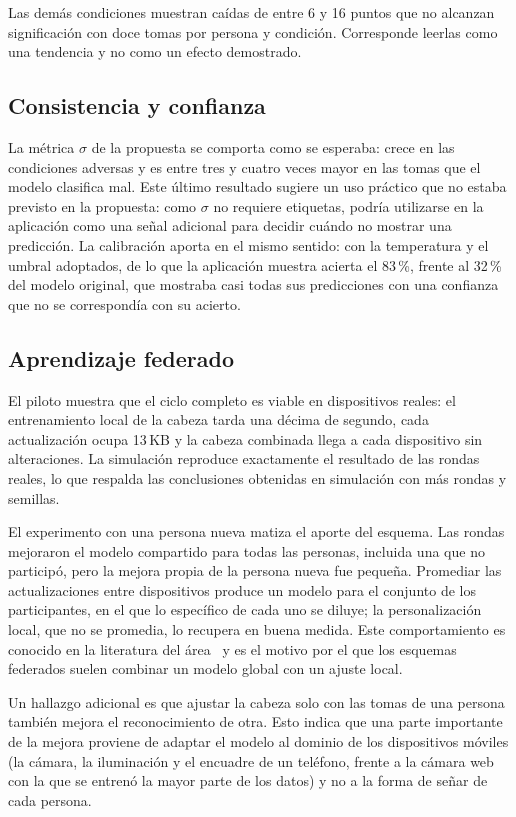 Las demás condiciones muestran caídas de entre 6 y 16 puntos que no alcanzan significación con doce tomas por persona y condición. Corresponde leerlas como una tendencia y no como un efecto demostrado.

\subsection{Consistencia y confianza}

La métrica $\sigma$ de la propuesta se comporta como se esperaba: crece en las condiciones adversas y es entre tres y cuatro veces mayor en las tomas que el modelo clasifica mal. Este último resultado sugiere un uso práctico que no estaba previsto en la propuesta: como $\sigma$ no requiere etiquetas, podría utilizarse en la aplicación como una señal adicional para decidir cuándo no mostrar una predicción. La calibración aporta en el mismo sentido: con la temperatura y el umbral adoptados, de lo que la aplicación muestra acierta el 83\,\%, frente al 32\,\% del modelo original, que mostraba casi todas sus predicciones con una confianza que no se correspondía con su acierto.

\subsection{Aprendizaje federado}

El piloto muestra que el ciclo completo es viable en dispositivos reales: el entrenamiento local de la cabeza tarda una décima de segundo, cada actualización ocupa 13\,KB y la cabeza combinada llega a cada dispositivo sin alteraciones. La simulación reproduce exactamente el resultado de las rondas reales, lo que respalda las conclusiones obtenidas en simulación con más rondas y semillas.

El experimento con una persona nueva matiza el aporte del esquema. Las rondas mejoraron el modelo compartido para todas las personas, incluida una que no participó, pero la mejora propia de la persona nueva fue pequeña. Promediar las actualizaciones entre dispositivos produce un modelo para el conjunto de los participantes, en el que lo específico de cada uno se diluye; la personalización local, que no se promedia, lo recupera en buena medida. Este comportamiento es conocido en la literatura del área~\cite{kairouz2021advances} y es el motivo por el que los esquemas federados suelen combinar un modelo global con un ajuste local.

Un hallazgo adicional es que ajustar la cabeza solo con las tomas de una persona también mejora el reconocimiento de otra. Esto indica que una parte importante de la mejora proviene de adaptar el modelo al dominio de los dispositivos móviles (la cámara, la iluminación y el encuadre de un teléfono, frente a la cámara web con la que se entrenó la mayor parte de los datos) y no a la forma de señar de cada persona.

